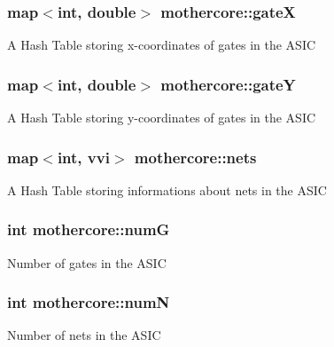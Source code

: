 \subsubsection[{gateX}]{\setlength{\rightskip}{0pt plus 5cm}map$<$int, double$>$ mothercore\+::gateX\hspace{0.3cm}{\ttfamily [private]}}\hypertarget{classmothercore_ac267207dbf960e3f837769edee99d024}{}\label{classmothercore_ac267207dbf960e3f837769edee99d024}
A Hash Table storing x-\/coordinates of gates in the A\+S\+IC 
\subsubsection[{gateY}]{\setlength{\rightskip}{0pt plus 5cm}map$<$int, double$>$ mothercore\+::gateY\hspace{0.3cm}{\ttfamily [private]}}\hypertarget{classmothercore_a9d61c6914daf39e900b2f1c729be4ed3}{}\label{classmothercore_a9d61c6914daf39e900b2f1c729be4ed3}
A Hash Table storing y-\/coordinates of gates in the A\+S\+IC 
\subsubsection[{nets}]{\setlength{\rightskip}{0pt plus 5cm}map$<$int, {\bf vvi}$>$ mothercore\+::nets\hspace{0.3cm}{\ttfamily [private]}}\hypertarget{classmothercore_a38b10c51ec32bf1583bcfcca022a378b}{}\label{classmothercore_a38b10c51ec32bf1583bcfcca022a378b}
A Hash Table storing informations about nets in the A\+S\+IC 
\subsubsection[{numG}]{\setlength{\rightskip}{0pt plus 5cm}int mothercore\+::numG\hspace{0.3cm}{\ttfamily [private]}}\hypertarget{classmothercore_ae81a713046775c9beb1e865f54238d58}{}\label{classmothercore_ae81a713046775c9beb1e865f54238d58}
Number of gates in the A\+S\+IC 
\subsubsection[{numN}]{\setlength{\rightskip}{0pt plus 5cm}int mothercore\+::numN\hspace{0.3cm}{\ttfamily [private]}}\hypertarget{classmothercore_a06dd4fcec53dffd503474103e59fd2ed}{}\label{classmothercore_a06dd4fcec53dffd503474103e59fd2ed}
Number of nets in the A\+S\+IC 
